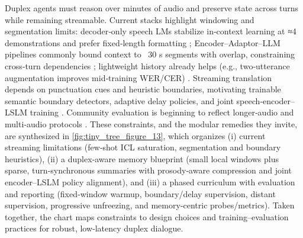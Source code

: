 \documentclass{article}
\begin{document}
Duplex agents must reason over minutes of audio and preserve state across turns while remaining streamable. Current stacks highlight windowing and segmentation limits: decoder‑only speech LMs stabilize in‑context learning at ≈4 demonstrations and prefer fixed‑length formatting \cite{hsu2024exploringcontextlearningtextlessspeechla}; Encoder–Adaptor–LLM pipelines commonly bound context to ~30 s segments with overlap, constraining cross‑turn dependencies \cite{nguyen2025qwenvsgemmaintegrationwhispercomparative}; lightweight history already helps (e.g., two‑utterance augmentation improves mid‑training WER/CER) \cite{li2025seewossubmissionmlcslmlessonslearnedspee}. Streaming translation depends on punctuation cues and heuristic boundaries, motivating trainable semantic boundary detectors, adaptive delay policies, and joint speech‑encoder–LSLM training \cite{guo2025streamuniachievingstreamingspeechtransla}. Community evaluation is beginning to reflect longer‑audio and multi‑audio protocols \cite{huang2025dynamicsuperbphase2collaborativelyexpand}. These constraints, and the modular remedies they invite, are synthesized in \autoref{fig:tiny_tree_figure_13}, which organizes (i) current streaming limitations (few‑shot ICL saturation, segmentation and boundary heuristics), (ii) a duplex‑aware memory blueprint (small local windows plus sparse, turn‑synchronous summaries with prosody‑aware compression and joint encoder–LSLM policy alignment), and (iii) a phased curriculum with evaluation and reporting (fixed‑window warmup, boundary/delay supervision, distant supervision, progressive unfreezing, and memory‑centric probes/metrics). Taken together, the chart maps constraints to design choices and training–evaluation practices for robust, low‑latency duplex dialogue.
\end{document}
